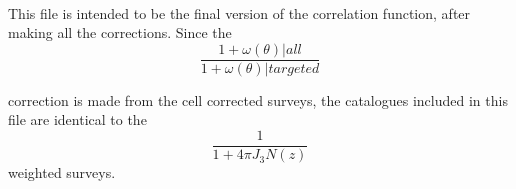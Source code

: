 \documentclass[11pt, oneside]{article}   	%
\begin{document}
\paragraph{} This file is intended to be the final version of the correlation function, after making all the corrections. Since the 
\begin{equation*}
\frac{1 + \omega(\theta)|all}{1 + \omega(\theta)|targeted}
\end{equation*}

correction is made from the cell corrected surveys, the catalogues included in this file are identical to the 
\begin{equation*}
\frac{1}{1 + 4 \pi  J_{3} N(z)}
\end{equation*}
 weighted surveys.
\end{document}
